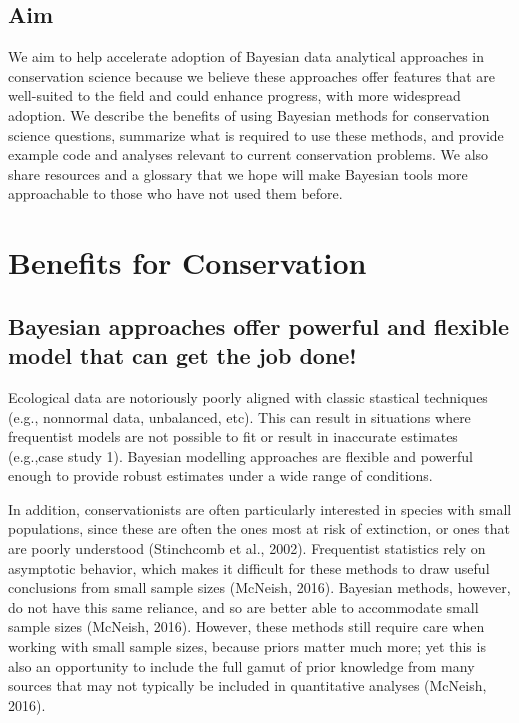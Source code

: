 \documentclass{article}
\begin{document}
\subsection*{Aim} We aim to help accelerate adoption of Bayesian data analytical approaches in conservation science because we believe these approaches offer features that are well-suited to the field and could enhance progress, with more  widespread adoption. We describe the benefits of using Bayesian methods for conservation science questions, summarize what is required to use these methods, and provide example code and analyses relevant to current conservation problems. We also share resources and a glossary that we hope will make Bayesian tools more approachable to those who have not used them before.

\section* {Benefits for Conservation}
\subsection*{Bayesian approaches offer powerful and flexible model that can get the job done!}
\par Ecological data are notoriously poorly aligned with classic stastical techniques (e.g., nonnormal data, unbalanced, etc). This can result in situations where frequentist models are not possible to fit or result in inaccurate estimates (e.g.,case study 1). Bayesian modelling approaches are flexible and powerful enough to provide robust estimates under a wide range of conditions. 
\par In addition, conservationists are often particularly interested in species with small populations, since these are often the ones most at risk of extinction, or ones that are poorly understood (Stinchcomb et al., 2002). Frequentist statistics rely on asymptotic behavior, which makes it difficult for these methods to draw useful conclusions from small sample sizes (McNeish, 2016). Bayesian methods, however, do not have this same reliance, and so are better able to accommodate small sample sizes (McNeish, 2016). However, these methods still require care when working with small sample sizes, because priors matter much more; yet this is also an opportunity to include the full gamut of prior knowledge from many sources that may not typically be included in quantitative analyses (McNeish, 2016). 
\end{document}
